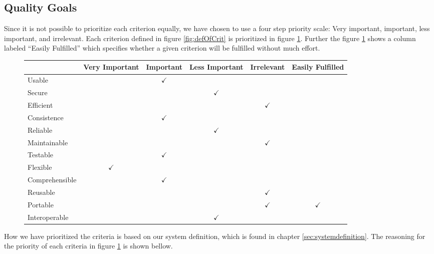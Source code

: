 \subsection{Quality Goals}
Since it is not possible to prioritize each criterion equally, we have chosen to use a four step priority scale: Very important, important, less important, and irrelevant.
Each criterion defined in figure \ref{fig:defOfCrit} is prioritized in figure \ref{fig:prioritizedCrit}.
Further the figure \ref{fig:prioritizedCrit} shows a column labeled ``Easily Fulfilled''
which specifies whether a given criterion will be fulfilled without much effort.

\begin{figure}[htbp]
	\centering
		\begin{tabular}{| l | m{} | m{}| m{}| m{}|m{}|} \hline
		  & Very  Important & Important & Less Important & Irrelevant & Easily Fulfilled \\ \hline
		Usable  & & \multicolumn{1}{c|}{$\checkmark$} & & & \\ \hline
		Secure  & & & \multicolumn{1}{c|}{$\checkmark$} & & \\ \hline
		Efficient & & & & \multicolumn{1}{c|}{$\checkmark$} & \\ \hline
		Consistence  & & \multicolumn{1}{c|}{$\checkmark$} & & & \\ \hline
		Reliable  & & & \multicolumn{1}{c|}{$\checkmark$} & & \\ \hline
		Maintainable  & & & & \multicolumn{1}{c|}{$\checkmark$} & \\ \hline
		Testable  & & \multicolumn{1}{c|}{$\checkmark$} & & & \\ \hline
		Flexible  & \multicolumn{1}{c|}{$\checkmark$} & & & & \\ \hline
		Comprehensible  & & \multicolumn{1}{c|}{$\checkmark$} & & & \\ \hline
		Reusable  & & & & \multicolumn{1}{c|}{$\checkmark$} & \\ \hline
		Portable & & & & \multicolumn{1}{c|}{$\checkmark$} & \multicolumn{1}{c|}{$\checkmark$} \\ \hline
		Interoperable & & & \multicolumn{1}{c|}{$\checkmark$} & & \\ \hline
		\end{tabular}
	\label{fig:prioritizedCrit}
\end{figure}

How we have prioritized the criteria is based on our system definition, which is found in chapter \ref{sec:systemdefinition}. The reasoning for the priority of each criteria in figure \ref{fig:prioritizedCrit} is shown bellow.

